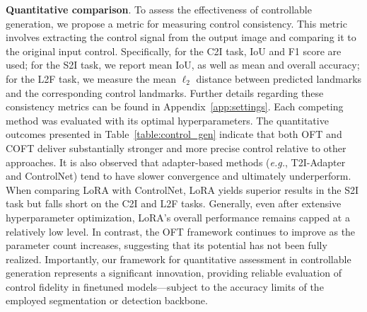 \textbf{Quantitative comparison}. To assess the effectiveness of controllable generation, we propose a metric for measuring control consistency. This metric involves extracting the control signal from the output image and comparing it to the original input control. Specifically, for the C2I task, IoU and F1 score are used; for the S2I task, we report mean IoU, as well as mean and overall accuracy; for the L2F task, we measure the mean $\ell_2$ distance between predicted landmarks and the corresponding control landmarks. Further details regarding these consistency metrics can be found in Appendix~\ref{app:settings}. Each competing method was evaluated with its optimal hyperparameters. The quantitative outcomes presented in Table~\ref{table:control_gen} indicate that both OFT and COFT deliver substantially stronger and more precise control relative to other approaches. It is also observed that adapter-based methods (\emph{e.g.}, T2I-Adapter and ControlNet) tend to have slower convergence and ultimately underperform. When comparing LoRA with ControlNet, LoRA yields superior results in the S2I task but falls short on the C2I and L2F tasks. Generally, even after extensive hyperparameter optimization, LoRA’s overall performance remains capped at a relatively low level. In contrast, the OFT framework continues to improve as the parameter count increases, suggesting that its potential has not been fully realized. Importantly, our framework for quantitative assessment in controllable generation represents a significant innovation, providing reliable evaluation of control fidelity in finetuned models—subject to the accuracy limits of the employed segmentation or detection backbone.

